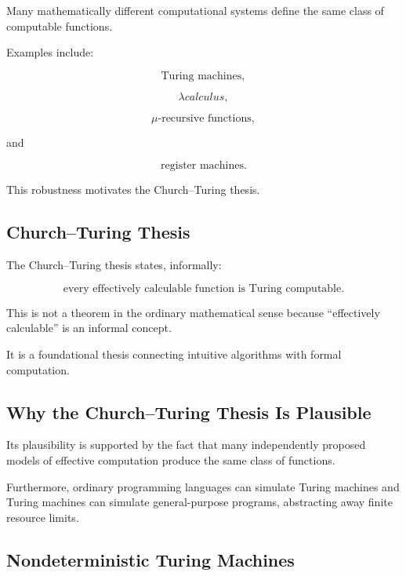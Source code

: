 Many mathematically different computational systems define the same class
of computable functions.

Examples include:

\[
\boxed{
\text{Turing machines},
}
\]

\[
\boxed{
\lambda calculus,
}
\]

\[
\boxed{
\mu\text{-recursive functions},
}
\]

and

\[
\boxed{
\text{register machines}.
}
\]

This robustness motivates the Church--Turing thesis.

\subsection{Church--Turing Thesis}
\label{subsec:church-turing-thesis}

The Church--Turing thesis states, informally:

\[
\boxed{
\text{every effectively calculable function is Turing computable}.
}
\]

This is not a theorem in the ordinary mathematical sense because
``effectively calculable'' is an informal concept.

It is a foundational thesis connecting intuitive algorithms with formal
computation.

\subsection{Why the Church--Turing Thesis Is Plausible}
\label{subsec:why-church-turing}

Its plausibility is supported by the fact that many independently proposed
models of effective computation produce the same class of functions.

Furthermore, ordinary programming languages can simulate Turing machines
and Turing machines can simulate general-purpose programs, abstracting away
finite resource limits.

\subsection{Nondeterministic Turing Machines}
\label{subsec:nondeterministic-turing-machines}

